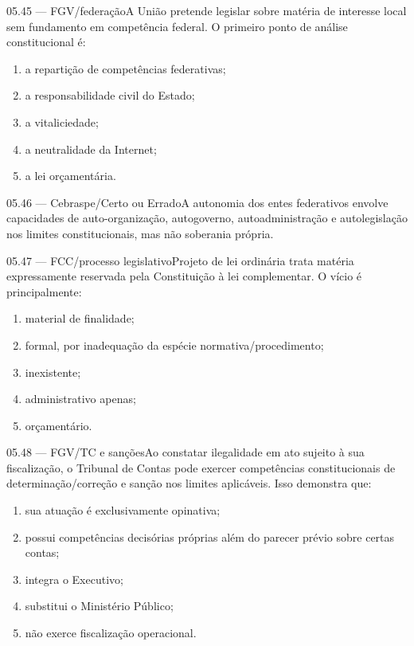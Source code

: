 \begin{questao}{ 05.45 — FGV/federação}A União pretende legislar sobre matéria de interesse local sem fundamento em competência federal. O primeiro ponto de análise constitucional é:\begin{enumerate}[label=\Alph*)]\item a repartição de competências federativas;\item a responsabilidade civil do Estado;\item a vitaliciedade;\item a neutralidade da Internet;\item a lei orçamentária.\end{enumerate}\end{questao}
\begin{questao}{ 05.46 — Cebraspe/Certo ou Errado}A autonomia dos entes federativos envolve capacidades de auto-organização, autogoverno, autoadministração e autolegislação nos limites constitucionais, mas não soberania própria.\end{questao}
\begin{questao}{ 05.47 — FCC/processo legislativo}Projeto de lei ordinária trata matéria expressamente reservada pela Constituição à lei complementar. O vício é principalmente:\begin{enumerate}[label=\Alph*)]\item material de finalidade;\item formal, por inadequação da espécie normativa/procedimento;\item inexistente;\item administrativo apenas;\item orçamentário.\end{enumerate}\end{questao}
\begin{questao}{ 05.48 — FGV/TC e sanções}Ao constatar ilegalidade em ato sujeito à sua fiscalização, o Tribunal de Contas pode exercer competências constitucionais de determinação/correção e sanção nos limites aplicáveis. Isso demonstra que:\begin{enumerate}[label=\Alph*)]\item sua atuação é exclusivamente opinativa;\item possui competências decisórias próprias além do parecer prévio sobre certas contas;\item integra o Executivo;\item substitui o Ministério Público;\item não exerce fiscalização operacional.\end{enumerate}\end{questao}
